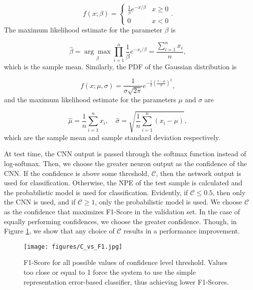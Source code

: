 \documentclass[journal,transmag]{IEEEtran}
\begin{document}
\begin{equation}
\label{eq:expon_pdf}
f\left( x; \beta \right) = \begin{cases}
\frac{1}{\beta} e^{-x/\beta} & x \geq 0 \\
0 & x < 0
\end{cases}.
\end{equation}
The maximum likelihood estimate for the parameter $\beta$ is 

\begin{equation}
\widehat{\beta} = \underset{\beta}{\arg\max} \prod_{i=1}^{n} \frac{1}{\beta} e^{-x_i / \beta} = \dfrac{\sum_{i=1}^{n}x_i}{n},
\end{equation}
which is the sample mean. Similarly, the PDF of the Gaussian distribution is

\begin{equation}
\label{eq:gaus_pdf}
f\left( x; \mu, \sigma \right) = \frac{1}{\sigma \sqrt{2 \pi}} e^{-\frac{1}{2} \left( \frac{x - \mu}{\sigma} \right)^{2}},
\end{equation}
and the maximum likelihood estimate for the parameters $\mu$ and $\sigma$ are

\begin{equation}
    \widehat{\mu} = \dfrac{1}{n} \sum_{i=1}^{n}x_i, \quad \widehat{\sigma} = \sqrt{\dfrac{1}{n} \sum_{i=1}^{n} \left(x_i - \mu\right)},
\end{equation}
which are the sample mean and sample standard deviation respectively.

At test time, the CNN output is passed through the softmax function instead of log-softmax. Then, we choose the greater neuron output as the confidence of the CNN. If the confidence is above some threshold, $\mathcal{C}$, then the network output is used for classification. Otherwise, the NPE of the test sample is calculated and the probabilistic model is used for classification. Evidently, if $\mathcal{C} \leq 0.5$, then only the CNN is used, and if $\mathcal{C} \geq 1$, only the probabilistic model is used. We choose $\mathcal{C}$ as the confidence that maximizes F1-Score in the validation set. In the case of equally performing confidences, we choose the greater confidence. Though, in Figure \ref{fig:C_vs_F1}, we show that any choice of $\mathcal{C}$ results in a performance improvement. 

\begin{figure}[!htbp]
    \captionsetup{font=footnotesize}
    \centering
    \texttt{[image: figures/C\_vs\_F1.jpg]}
    \caption{F1-Score for all possible values of confidence level threshold. Values too close or equal to 1 force the system to use the simple representation error-based classifier, thus achieving lower F1-Scores.}
    \label{fig:C_vs_F1}
\end{figure}
\end{document}
